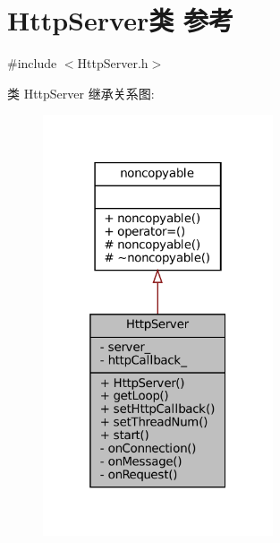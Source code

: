 \hypertarget{classmuduo_1_1net_1_1HttpServer}{}\section{Http\+Server类 参考}
\label{classmuduo_1_1net_1_1HttpServer}


{\ttfamily \#include $<$Http\+Server.\+h$>$}



类 Http\+Server 继承关系图\+:
\nopagebreak
\begin{figure}[H]
\begin{center}
\leavevmode
\includegraphics[width=193pt]{classmuduo_1_1net_1_1HttpServer__inherit__graph}
\end{center}
\end{figure}


